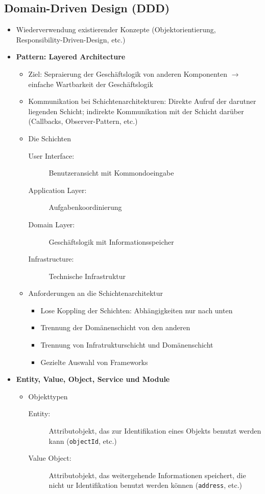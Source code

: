 \subsection{Domain-Driven Design (DDD)}
\begin{itemize}
	\item Wiederverwendung existierender Konzepte (Objektorientierung, Responsibility-Driven-Design, etc.)
	\item \textbf{Pattern: Layered Architecture}
	\begin{itemize}
		\item Ziel: Sepraierung der Geschäftslogik von anderen Komponenten \(\rightarrow\) einfache Wartbarkeit der Geschäftslogik
		\item Kommunikation bei Schichtenarchitekturen: Direkte Aufruf der darutner liegenden Schicht; indirekte Kommunikation mit der Schicht darüber (Callbacks, Observer-Pattern, etc.)
		\item Die Schichten
		\begin{description}
			\item[User Interface:] Benutzeransicht mit Kommondoeingabe
			\item[Application Layer:] Aufgabenkoordinierung
			\item[Domain Layer:] Geschäftslogik mit Informationsspeicher
			\item[Infrastructure:] Technische Infrastruktur
		\end{description}
		\item Anforderungen an die Schichtenarchitektur
		\begin{itemize}
			\item Lose Koppling der Schichten: Abhängigkeiten nur nach unten
			\item Trennung der Domänenschicht von den anderen
			\item Trennung von Infratrukturschicht und Domänenschicht
			\item Gezielte Auswahl von Frameworks
		\end{itemize}
	\end{itemize}
	\item \textbf{Entity, Value, Object, Service und Module}
	\begin{itemize}
		\item Objekttypen
		\begin{description}
			\item[Entity:] Attributobjekt, das zur Identifikation eines Objekts benutzt werden kann (\texttt{objectId}, etc.)
			\item[Value Object:] Attributobjekt, das weitergehende Informationen speichert, die nicht ur Identifikation benutzt werden können (\texttt{address}, etc.)

\end{description}
\end{itemize}
\end{itemize}
